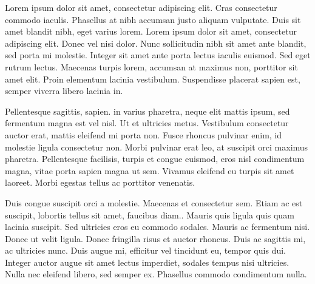 








 Lorem ipsum dolor sit amet, consectetur adipiscing elit. Cras consectetur commodo iaculis. Phasellus at nibh accumsan justo aliquam vulputate. Duis sit amet blandit nibh, eget varius lorem. Lorem ipsum dolor sit amet, consectetur adipiscing elit. Donec vel nisi dolor. Nunc sollicitudin nibh sit amet ante blandit, sed porta mi molestie. Integer sit amet ante porta lectus iaculis euismod. Sed eget rutrum lectus. Maecenas turpis lorem, accumsan at maximus non, porttitor sit amet elit. Proin elementum lacinia vestibulum. Suspendisse placerat sapien est, semper viverra libero lacinia in.

Pellentesque sagittis, sapien. in varius pharetra, neque elit mattis ipsum, sed fermentum magna est vel nisl. Ut et ultricies metus. Vestibulum consectetur auctor erat, mattis eleifend mi porta non. Fusce rhoncus pulvinar enim, id molestie ligula consectetur non. Morbi pulvinar erat leo, at suscipit orci maximus pharetra. Pellentesque facilisis, turpis et congue euismod, eros nisl condimentum magna, vitae porta sapien magna ut sem. Vivamus eleifend eu turpis sit amet laoreet. Morbi egestas tellus ac porttitor venenatis.

Duis congue suscipit orci a molestie. Maecenas et consectetur sem. Etiam ac est suscipit, lobortis tellus sit amet, faucibus diam.. Mauris quis ligula quis quam lacinia suscipit. Sed ultricies eros eu commodo sodales. Mauris ac fermentum nisi. Donec ut velit ligula. Donec fringilla risus et auctor rhoncus. Duis ac sagittis mi, ac ultricies nunc. Duis augue mi, efficitur vel tincidunt eu, tempor quis dui. Integer auctor augue sit amet lectus imperdiet, sodales tempus nisi ultricies. Nulla nec eleifend libero, sed semper ex. Phasellus commodo condimentum nulla. 


